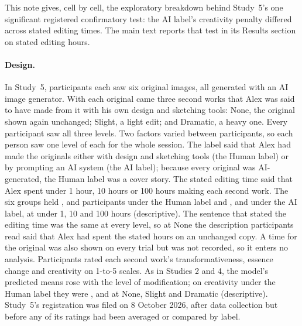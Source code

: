 
This note gives, cell by cell, the exploratory breakdown behind Study~5's one significant registered confirmatory test: the AI label's creativity penalty differed across stated editing times. The main text reports that test in its Results section on stated editing hours.

\paragraph*{Design.}
In Study~5, \SFiveN{} participants each saw six original images, all generated with an AI image generator. With each original came three second works that Alex was said to have made from it with his own design and sketching tools: None, the original shown again unchanged; Slight, a light edit; and Dramatic, a heavy one. Every participant saw all three levels. Two factors varied between participants, so each person saw one level of each for the whole session. The label said that Alex had made the originals either with design and sketching tools (the Human label) or by prompting an AI system (the AI label); because every original was AI-generated, the Human label was a cover story. The stated editing time said that Alex spent under 1 hour, 10 hours or 100 hours making each second work. The six groups held \SFiveNHumanUnderOneHour, \SFiveNHumanTenHours{} and \SFiveNHumanHundredHours{} participants under the Human label and \SFiveNAIUnderOneHour, \SFiveNAITenHours{} and \SFiveNAIHundredHours{} under the AI label, at under 1, 10 and 100 hours (descriptive). The sentence that stated the editing time was the same at every level, so at None the description participants read said that Alex had spent the stated hours on an unchanged copy. A time for the original was also shown on every trial but was not recorded, so it enters no analysis. Participants rated each second work's transformativeness, essence change and creativity on 1-to-5 scales. As in Studies 2 and 4, the model's predicted means rose with the level of modification; on creativity under the Human label they were \SFiveCreatMeanHumanNone, \SFiveCreatMeanHumanSlight{} and \SFiveCreatMeanHumanDramatic{} at None, Slight and Dramatic (descriptive). Study~5's registration was filed on 8 October 2026, after data collection but before any of its ratings had been averaged or compared by label.

